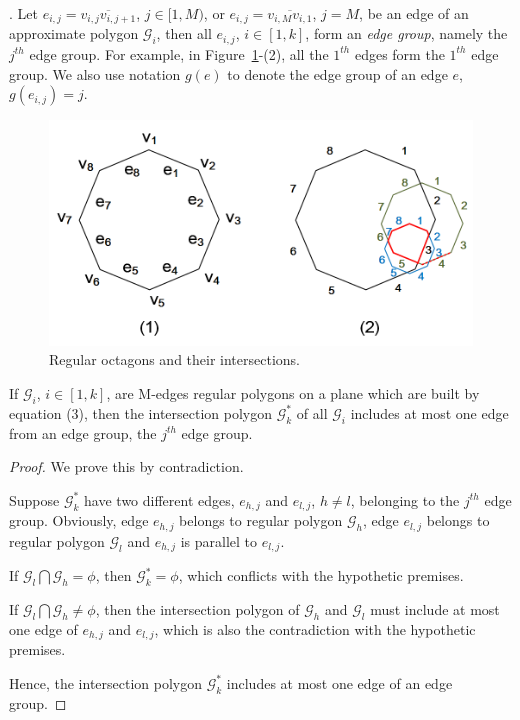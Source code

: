 .
Let $e_{i,j} = \overline{v_{i,j}v_{i,j+1}}$, $j\in [1,M)$, or $e_{i,j} = \overline{v_{i,M}v_{i,1}}$, $j = M$, be an edge of an approximate polygon
$\mathcal{G}_i$, then all $e_{i,j}$, $i\in [1, k]$, form an \emph{edge group}, namely the $j^{th}$ edge group.
%
For example, in Figure~\ref{fig:polygons}-(2), all the $1^{th}$ edges form the $1^{th}$ edge group.
%
We also use notation $g(e)$ to denote the edge group of an edge $e$, \ie $g(e_{i,j})=j$.



\begin{figure}[tb!]
\centering
\includegraphics[scale=0.88]{figures/Fig-polygons.png}
\vspace{-1ex}
\caption{\small Regular octagons and their intersections.}
\vspace{-2ex}
\label{fig:polygons}
\end{figure}



\begin{theorem}
\label{prop-rp-intersection}
If $\mathcal{G}_i$, $i \in [1, k]$, are M-edges regular polygons on a plane which are built by equation (3), then the intersection polygon
$\mathcal{G}^*_k$ of all $\mathcal{G}_i$ includes at most one edge from an edge group, \eg the $j^{th}$ edge group.
\end{theorem}


\begin{proof}
We prove this by contradiction.

Suppose $\mathcal{G}^*_k$ have two different edges, $e_{h,j}$ and $e_{l,j}$, $h\ne l$, belonging to the $j^{th}$ edge group. Obviously, edge
$e_{h,j}$ belongs to regular polygon $\mathcal{G}_h$, edge $e_{l,j}$ belongs to regular polygon $\mathcal{G}_l$ and $e_{h,j}$ is parallel to
$e_{l,j}$.

If $\mathcal{G}_l \bigcap \mathcal{G}_h = \phi$, then $\mathcal{G}^*_k=\phi$, which conflicts with the hypothetic premises.

If $\mathcal{G}_l \bigcap \mathcal{G}_h \ne \phi$, then the intersection polygon of $\mathcal{G}_h$ and $\mathcal{G}_l$ must include at most
one edge of $e_{h,j}$ and $e_{l,j}$, which is also the contradiction with the hypothetic premises.

Hence, the intersection polygon $\mathcal{G}^*_k$ includes at most one edge of an edge group.
%
\end{proof}



